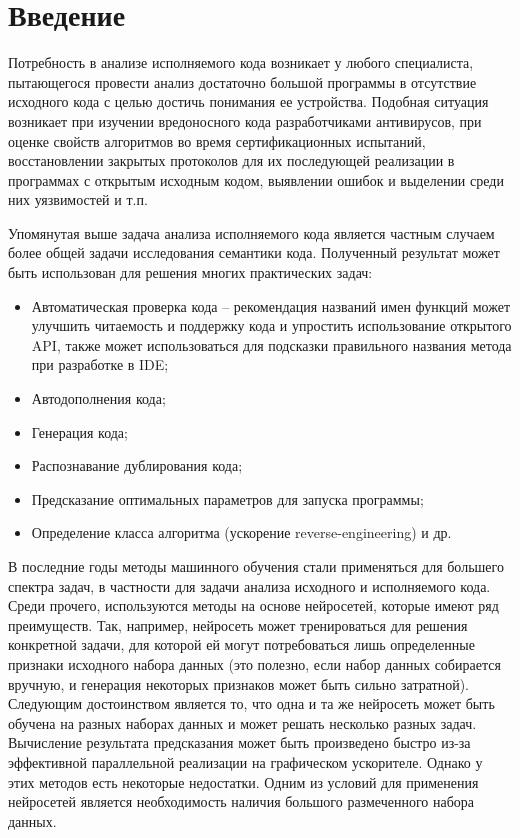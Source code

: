 \section*{Введение} 
Потребность в анализе исполняемого кода возникает у любого специалиста, пытающегося провести анализ достаточно большой программы в отсутствие исходного кода с целью достичь понимания ее устройства. Подобная ситуация возникает при изучении вредоносного кода разработчиками антивирусов, при оценке свойств алгоритмов во время сертификационных испытаний, восстановлении закрытых протоколов для их последующей реализации в программах с открытым исходным кодом, выявлении ошибок и выделении среди них уязвимостей и т.п.

Упомянутая выше задача анализа исполняемого кода является частным случаем более общей задачи исследования семантики кода. Полученный результат может быть использован для решения многих практических задач:
\begin{itemize}
	\item Автоматическая проверка кода -- рекомендация названий имен функций может улучшить читаемость и поддержку кода и упростить использование открытого API, также может использоваться для подсказки правильного названия метода при разработке в IDE;
	\item Автодополнения кода;
	\item Генерация кода;
	\item Распознавание дублирования кода;
	\item Предсказание оптимальных параметров для запуска программы;
	\item Определение класса алгоритма (ускорение reverse-engineering) и др.
\end{itemize}

В последние годы методы машинного обучения стали применяться для большего спектра задач, в частности для задачи анализа исходного и исполняемого кода. Среди прочего, используются методы на основе нейросетей, которые имеют ряд преимуществ. Так, например, нейросеть может тренироваться для решения конкретной задачи, для которой ей могут потребоваться лишь определенные признаки исходного набора данных (это полезно, если набор данных собирается вручную, и генерация некоторых признаков может быть сильно затратной). Следующим достоинством является то, что одна и та же нейросеть может быть обучена на разных наборах данных и может решать несколько разных задач. Вычисление результата предсказания может быть произведено быстро из-за эффективной параллельной реализации на графическом ускорителе. Однако у этих методов есть некоторые недостатки. Одним из условий для применения нейросетей является необходимость наличия большого размеченного набора данных.

